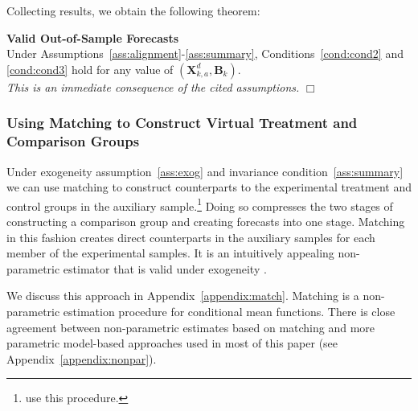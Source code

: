 Collecting results, we obtain the following theorem:

\onehalfspacing
\setcounter{theorem}{0}
\begin{theorem}\label{theorem:main} \textbf{Valid Out-of-Sample Forecasts} \\
Under Assumptions~\ref{ass:alignment}-\ref{ass:summary}, Conditions~\ref{cond:cond2} and \ref{cond:cond3} hold for any value of $\left( \bm{X}^d_{k,a}, \bm{B}_k \right)$. \\
\emph{This is an immediate consequence of the cited assumptions.} $\Box$
\end{theorem}
\doublespacing

\subsubsection{Using Matching to Construct Virtual Treatment and Comparison Groups}\label{usingmatching}

Under exogeneity assumption~\ref{ass:exog} and invariance condition~\ref{ass:summary} we can use matching to construct counterparts to the experimental treatment and control groups in the auxiliary sample.\footnote{\citet{Heckman_Ichimura_etal_1998_Econometrica} use this procedure.} Doing so compresses the two stages of constructing a comparison group and creating forecasts into one stage. Matching in this fashion creates direct counterparts in the auxiliary samples for each member of the experimental samples. It is an intuitively appealing non-parametric estimator that is valid under exogeneity \citep{Heckman_Navarro_2004_REStat}.

We discuss this approach in Appendix~\ref{appendix:match}. Matching is a non-parametric estimation procedure for conditional mean functions. There is close agreement between non-parametric estimates based on matching and more parametric model-based approaches used in most of this paper (see  Appendix~\ref{appendix:nonpar}).

